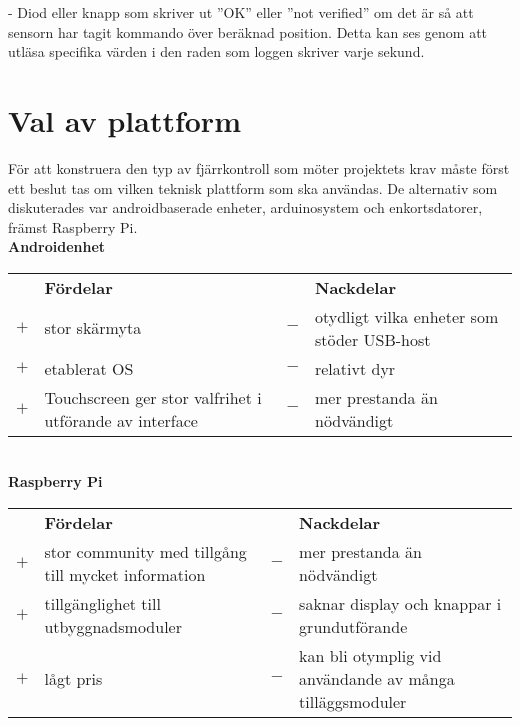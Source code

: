 \documentclass[a4paper]{article}
\begin{document}
		\noindent- Diod eller knapp som skriver ut ”OK” eller ”not verified” om det är så att sensorn har tagit kommando över beräknad position. Detta kan ses genom att utläsa specifika värden i den raden som loggen skriver varje sekund.

	\newpage

	\section{Val av plattform} %
	\label{sec:val_av_plattform}

		För att konstruera den typ av fjärrkontroll som möter projektets krav måste först ett beslut tas om vilken teknisk plattform som ska användas. De alternativ som diskuterades var androidbaserade enheter, arduinosystem och enkortsdatorer, främst Raspberry Pi.\\

		\noindent\textsf{\textbf{Androidenhet}}\\
		\begin{tabularx}{\textwidth}{@{}cXcX}
			& \textbf{Fördelar} 	& & \textbf{Nackdelar} \\
			$+$ & stor skärmyta 	&	$-$ & otydligt vilka enheter som stöder 								USB-host \\
			$+$ &  etablerat OS 	& $-$ & relativt dyr \\
			$+$	&  Touchscreen ger stor valfrihet i utförande av interface				& $-$ & mer prestanda än nödvändigt
		\end{tabularx}\\

			
		\noindent\textsf{\textbf{Raspberry Pi}}\\
		\begin{tabularx}{\textwidth}{@{}cXcX}
			& \textbf{Fördelar} 	& & \textbf{Nackdelar} \\
			$+$ & stor community med tillgång till mycket information & $-$ & mer prestanda än nödvändigt \\
			$+$ & tillgänglighet till utbyggnadsmoduler & $-$ & saknar display och knappar i grundutförande \\
			$+$ & lågt pris&	$-$ & kan bli otymplig vid användande av många tilläggsmoduler \\	
		\end{tabularx}\\
\end{document}
